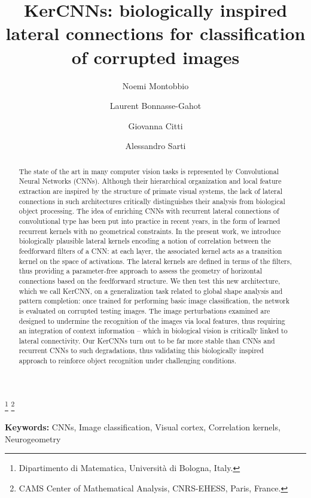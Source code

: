 \documentclass[11pt,oneside,reqno]{amsart}
\begin{document}
 \title[KerCNNs]{KerCNNs: biologically inspired lateral connections for classification of corrupted images}
 \author[N. Montobbio]{Noemi Montobbio}
 \thanks{ Dipartimento di Matematica, Universit\`{a} di Bologna, Italy.} \thanks{ CAMS Center of Mathematical Analysis, CNRS-EHESS, Paris, France.}
 \author[L. Bonnasse-Gahot]{Laurent Bonnasse-Gahot}
 \author[G. Citti]{Giovanna Citti}
 \author[A. Sarti]{Alessandro Sarti}
 \date{}
 \maketitle
 
 {\bf Keywords:} CNNs, Image classification, Visual cortex, Correlation kernels, Neurogeometry
 
 \begin{abstract}
  The state of the art in many computer vision tasks is represented by Convolutional Neural Networks (CNNs). Although their hierarchical organization and local feature extraction are inspired by the structure of primate visual systems, the lack of lateral connections in such architectures critically distinguishes their analysis from biological object processing. The idea of enriching CNNs with recurrent lateral connections of convolutional type has been put into practice in recent years, in the form of learned recurrent kernels with no geometrical constraints. In the present work, we introduce biologically plausible lateral kernels encoding a notion of correlation between the feedforward filters of a CNN: at each layer, the associated kernel acts as a transition kernel on the space of activations. The lateral kernels are defined in terms of the filters, thus providing a parameter-free approach to assess the geometry of horizontal connections based on the feedforward structure. We then test this new architecture, which we call KerCNN, on a generalization task related to global shape analysis and pattern completion: once trained for performing basic image classification, the network is evaluated on corrupted testing images. The image perturbations examined are designed to undermine the recognition of the images via local features, thus requiring an integration of context information -- which in biological vision is critically linked to lateral connectivity. Our KerCNNs turn out to be far more stable than CNNs and recurrent CNNs to such degradations, thus validating this biologically inspired approach to reinforce object recognition under challenging conditions.
 \end{abstract}
\end{document}
